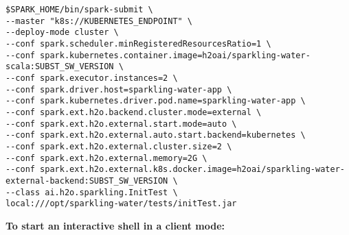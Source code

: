 \begin{lstlisting}[style=Bash]
$SPARK_HOME/bin/spark-submit \
--master "k8s://KUBERNETES_ENDPOINT" \
--deploy-mode cluster \
--conf spark.scheduler.minRegisteredResourcesRatio=1 \
--conf spark.kubernetes.container.image=h2oai/sparkling-water-scala:SUBST_SW_VERSION \
--conf spark.executor.instances=2 \
--conf spark.driver.host=sparkling-water-app \
--conf spark.kubernetes.driver.pod.name=sparkling-water-app \
--conf spark.ext.h2o.backend.cluster.mode=external \
--conf spark.ext.h2o.external.start.mode=auto \
--conf spark.ext.h2o.external.auto.start.backend=kubernetes \
--conf spark.ext.h2o.external.cluster.size=2 \
--conf spark.ext.h2o.external.memory=2G \
--conf spark.ext.h2o.external.k8s.docker.image=h2oai/sparkling-water-external-backend:SUBST_SW_VERSION \
--class ai.h2o.sparkling.InitTest \
local:///opt/sparkling-water/tests/initTest.jar
\end{lstlisting}

\textbf{To start an interactive shell in a client mode:}

